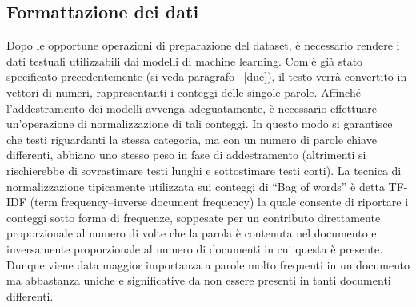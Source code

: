 \documentclass[12pt,oneside]{article}
\begin{document}
    \begin{enumerate}
    \subsection{Formattazione dei dati}
    \begin{justify}
    Dopo le opportune operazioni di preparazione del dataset, è necessario rendere i dati testuali utilizzabili dai modelli di machine learning. Com’è già stato specificato precedentemente (si veda paragrafo ~\ref{due}), il testo verrà convertito in vettori di numeri, rappresentanti i conteggi delle singole parole. 
    Affinché l’addestramento dei modelli avvenga adeguatamente, è necessario effettuare un’operazione di normalizzazione di tali conteggi. In questo modo si garantisce che testi riguardanti la stessa categoria, ma con un numero di parole chiave differenti, abbiano uno stesso peso in fase di addestramento (altrimenti si rischierebbe di sovrastimare testi lunghi e sottostimare testi corti). 
    La tecnica di normalizzazione tipicamente utilizzata sui conteggi di “Bag of words” è detta TF-IDF (term frequency–inverse document frequency) la quale consente di riportare i conteggi sotto forma di frequenze, soppesate per un contributo direttamente proporzionale al numero di volte che la parola è contenuta nel documento e inversamente proporzionale al numero di documenti in cui questa è presente. Dunque viene data maggior importanza a parole molto frequenti in un documento ma abbastanza uniche e significative da non essere presenti in tanti documenti differenti.

    \end{justify}
    \end{enumerate}
\end{document}
